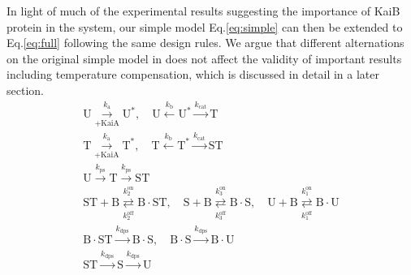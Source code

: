 \documentclass[a4paper,10pt]{article}
\numberwithin{equation}{section}
\begin{document}
In light of much of the experimental results suggesting the importance of KaiB protein in the system, our simple model Eq.\ref{eq:simple} can then be extended to Eq.\ref{eq:full} following the same design rules. We argue that different alternations on the original simple model in does not affect the validity of important results including temperature compensation, which is discussed in detail in a later section.
\begin{equation}
\begin{gathered}
\mathrm U \overset{k_{\mathrm{a}}}{\underset{+\mathrm {KaiA}}{\longrightarrow}} \mathrm U^{*}, \quad \mathrm U \overset{k_{\mathrm {b}}}{\longleftarrow} \mathrm U^{*} \overset{ k_\mathrm {cat}}{\longrightarrow} \mathrm T 
\\ 
\mathrm T \overset{k_{\mathrm{a}}}{\underset{+\mathrm {KaiA}}{\longrightarrow}} \mathrm T^{*},\quad \mathrm T \overset{k_{\mathrm {b}}}{\longleftarrow} \mathrm T^{*} \overset{ k_\mathrm{cat}}{\longrightarrow} \mathrm{ST} \\
\mathrm{U} \overset{ k_\mathrm{ps}}{\longrightarrow} \mathrm{T} \overset{ k_\mathrm{ps}}{\longrightarrow} \mathrm{ST} \\
\mathrm {ST}+\mathrm B\overset{ k_{2}^{\mathrm{on}}}{\underset{k_{2}^{\mathrm{off}}}{\rightleftarrows}} \mathrm {B\cdot ST},\quad \mathrm S+\mathrm B\overset{ k_{3}^{\mathrm{on}}}{\underset{k_{3}^{\mathrm{off}}}{\rightleftarrows}} \mathrm {B\cdot S},\quad \mathrm U+\mathrm B\overset{ k_{1}^{\mathrm{on}}}{\underset{k_{1}^{\mathrm{off}}}{\rightleftarrows}} \mathrm {B\cdot U}\\
\mathrm {B\cdot ST} \overset{ k_{\mathrm{dps}}}{\longrightarrow} \mathrm{B\cdot S}, \quad
\mathrm {B\cdot S} \overset{ k_{\mathrm{dps}}}{\longrightarrow} \mathrm{B\cdot U}\\
 \mathrm{ST} \overset{ k_\mathrm{dps}}{\longrightarrow} \mathrm{S} \overset{ k_\mathrm{dps}}{\longrightarrow} \mathrm{U} \\
\end{gathered}\label{eq:full}
\end{equation}
\end{document}
